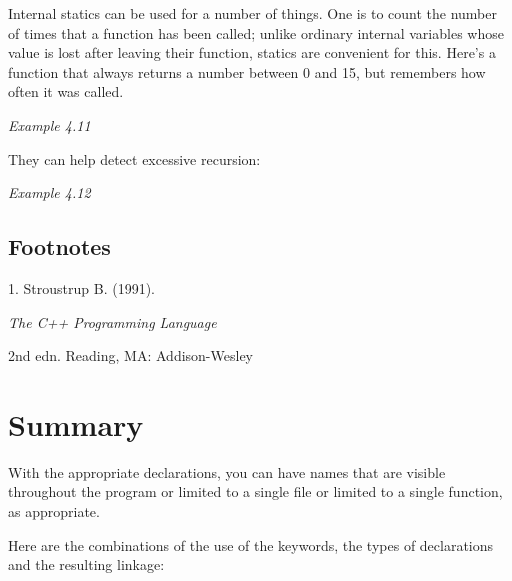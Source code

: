    Internal statics can be used for a number of things. One is to count
    the number of times that a function has been called; unlike ordinary
    internal variables whose value is lost after leaving their function,
    statics are convenient for this. Here's a function that always returns a
    number between 0 and 15, but remembers how often it was called.

\begin{center}\textit{Example 4.11}\end{center}

   They can help detect excessive recursion:

\begin{center}\textit{Example 4.12}\end{center}


  

 \subsection{Footnotes}1. Stroustrup
     B. (1991). \begin{center}\textit{The C++ Programming Language}\end{center}

 2nd edn.
     Reading, MA: Addison-Wesley


        \section{Summary}
        

  With the appropriate declarations, you can have names that are visible
   throughout the program or limited to a single file or limited to a single
   function, as appropriate.


  Here are the combinations of the use of the keywords, the types of
   declarations and the resulting linkage:


